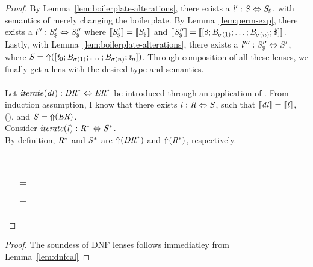 \begin{lemma}
\begin{proof}
By Lemma~\ref{lem:boilerplate-alterations}, there exists a
$\mathit{l}' : \mathit{S} \Leftrightarrow \mathit{S}_{\$}$, with semantics of
merely changing the boilerplate.
By Lemma~\ref{lem:perm-exp}, there exists a $\mathit{l}'' : \mathit{S}_{\$}'
\Leftrightarrow \mathit{S}_{\$}''$ where
$[ \! [\mathit{S}_{\$}'] \! ]=[ \! [\mathit{S}_{\$}] \! ]$ and 
$[ \! [\mathit{S}_{\$}''] \! ]=[ \! [[\$; \mathit{B}_{\sigma(1)} ; \ldots ; \mathit{B}_{\sigma(n)} ; \$]] \! ]$.
Lastly, with Lemma~\ref{lem:boilerplate-alterations}, there exists a
$\mathit{l}''' : \mathit{S}_{\$}'' \Leftrightarrow \mathit{S}'$, where
$\mathit{S} = \mathit{\Uparrow}([\mathit{t}_0; \mathit{B}_{\sigma(1)} ; \ldots ; \mathit{B}_{\sigma(n)} ; \mathit{t}_n])$.
Through composition of all these lenses, we finally get a lens with the desired type
and semantics.\\
\\
Let $\mathit{iterate(\mathit{dl})} : \mathit{DR}^* \Leftrightarrow \mathit{ER}^*$
be introduced through an application of \IterateAtomLensRule{}.
From induction assumption, I know that there exists $\mathit{l} : \mathit{R} \Leftrightarrow \mathit{S}$, such that
$[ \! [\mathit{dl}] \! ]=[ \! [\mathit{l}] \! ]$,
\Regex=\ToRegex(\DNFRegex), and
$\mathit{S}=\mathit{\Uparrow}(\mathit{ER})$.\\
Consider $\mathit{iterate(\mathit{l})} : \mathit{R}^* \Leftrightarrow \mathit{S}^*$.\\
By definition, $\mathit{R}^*$ and $\mathit{S}^*$ are $\mathit{\Uparrow}(\mathit{DR}^*)$
and $\mathit{\Uparrow}(\mathit{R}^*)$, respectively.

\begin{tabular}{RcL}
\SemanticsOf{\IterateLens{\Lens}} & = &
\\
& = &
\\
& = &
\SemanticsOf{\IterateLens{\DNFLens}}
\end{tabular}
\end{proof}
\end{lemma}

\dnfls*
\begin{proof}

The soundess of DNF lenses follows immediatley from Lemma~\ref{lem:dnfcal}

\end{proof}

